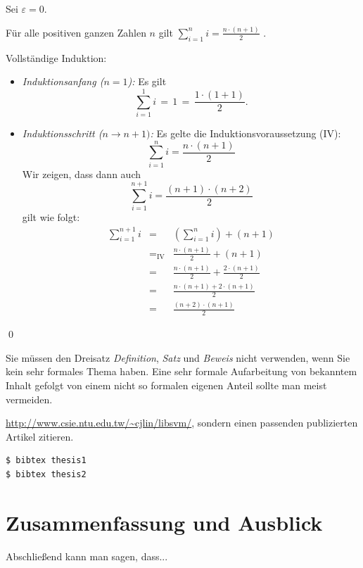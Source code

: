 \documentclass[11pt,a4paper]{report}
\begin{document}
\begin{definition}
Sei $\varepsilon = 0$.
\end{definition}

\begin{satz}
Für alle positiven ganzen Zahlen $n$ gilt 
$\sum_{i=1}^n i = \frac{n \cdot (n+1)}{2}$ \enspace.
\end{satz}
\begin{beweis}
Vollständige Induktion:
\begin{itemize}
\item \emph{Induktionsanfang ($n=1$):} Es gilt  
\[
  \sum_{i=1}^1 i \, = \, 1 \, = \, \frac{1 \cdot (1+1)}{2}.
\]
\item \emph{Induktionsschritt ($n \rightarrow n+1)$:}
Es gelte die Induktionsvoraussetzung (IV):
\[
\sum_{i=1}^n i = \frac{n \cdot (n+1)}{2}
\]
Wir zeigen, dass dann auch 
\[
\sum_{i=1}^{n+1} i = \frac{(n+1) \cdot (n+2)}{2}
\]
gilt wie folgt:
\begin{eqnarray*}
  \sum_{i=1}^{n+1} i 
  & = & (\sum_{i=1}^{n} i) + (n+1)  \\
  & =_{\mbox{IV}} & \frac{n \cdot (n+1)}{2} + (n+1) \\
  & = & \frac{n \cdot (n+1)}{2} + \frac{2 \cdot (n+1)}{2} \\
  & = & \frac{n \cdot (n+1) + 2 \cdot (n+1)}{2} \\
  & = & \frac{(n+2) \cdot (n+1)}{2} 
\end{eqnarray*}
\end{itemize}
\qed
\end{beweis}
Sie müssen den Dreisatz 
\emph{Definition}, \emph{Satz} und \emph{Beweis} nicht verwenden, 
wenn Sie kein sehr formales Thema haben. 
Eine sehr formale Aufarbeitung von bekanntem Inhalt gefolgt 
von einem nicht so formalen eigenen Anteil sollte man 
meist vermeiden.

\url{http://www.csie.ntu.edu.tw/~cjlin/libsvm/}, 
sondern einen passenden publizierten Artikel zitieren.

\begin{verbatim}
$ bibtex thesis1
$ bibtex thesis2
\end{verbatim}


\chapter{Zusammenfassung und Ausblick} \label{chap:fazit}

Abschließend kann man sagen, dass...
\end{document}
